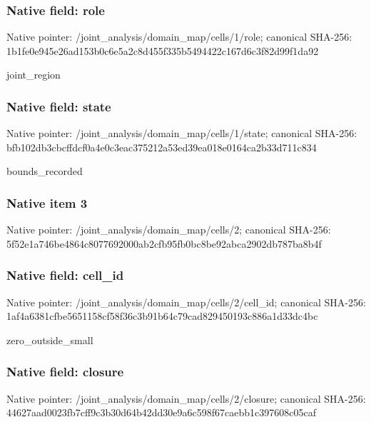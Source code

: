 \documentclass[10pt,a4paper]{article}
\begin{document}
\subsubsection{Native field: role}
Native pointer: /joint\_\allowbreak{}analysis/domain\_\allowbreak{}map/cells/1/role; canonical SHA-256: 1b1fe0e945e26ad153b0c6e5a2c8d455f335b5494422c167d6c3f82d99f1da92

\begingroup\raggedright\sloppy joint\_\allowbreak{}region\par\endgroup

\subsubsection{Native field: state}
Native pointer: /joint\_\allowbreak{}analysis/domain\_\allowbreak{}map/cells/1/state; canonical SHA-256: bfb102db3cbcffdcf0a4e0c3eac375212a53ed39ea018e0164ca2b33d711c834

\begingroup\raggedright\sloppy bounds\_\allowbreak{}recorded\par\endgroup

\subsubsection{Native item 3}
Native pointer: /joint\_\allowbreak{}analysis/domain\_\allowbreak{}map/cells/2; canonical SHA-256: 5f52e1a746be4864c8077692000ab2cfb95fb0bc8be92abca2902db787ba8b4f

\subsubsection{Native field: cell\_\allowbreak{}id}
Native pointer: /joint\_\allowbreak{}analysis/domain\_\allowbreak{}map/cells/2/cell\_\allowbreak{}id; canonical SHA-256: 1af4a6381cfbe5651158cf58f36c3b91b64c79cad829450193c886a1d33dc4bc

\begingroup\raggedright\sloppy zero\_\allowbreak{}outside\_\allowbreak{}small\par\endgroup

\subsubsection{Native field: closure}
Native pointer: /joint\_\allowbreak{}analysis/domain\_\allowbreak{}map/cells/2/closure; canonical SHA-256: 44627aad0023fb7cff9c3b30d64b42dd30e9a6c598f67caebb1c397608c05caf
\end{document}
